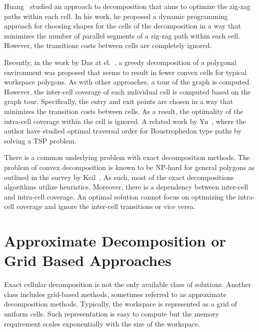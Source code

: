 \documentclass[../main.tex]{subfiles}
\begin{document}
Huang~\cite{Huang2001optimal} studied an approach to decomposition that aims to optimize the zig-zag paths within each cell. In his work, he proposed a dynamic programming approach for choosing shapes for the cells of the decomposition in a way that minimizes the number of parallel segments of a zig-zag path within each cell. However, the transitions costs between cells are completely ignored.

Recently, in the work by Das at el.~\cite{das2014mapping}, a greedy decomposition of a polygonal environment was proposed that seems to result in fewer convex cells for typical workspace polygons. As with other approaches, a tour of the graph is computed. However, the inter-cell coverage of each individual cell is computed based on the graph tour. Specifically, the entry and exit points are chosen in a way that minimizes the transition costs between cells. As a result, the optimality of the intra-cell coverage within the cell is ignored. A related work by Yu~\cite{yu2015optimization}, where the author have studied optimal traversal order for Boustrophedon type paths by solving a TSP problem.

There is a common underlying problem with exact decomposition methods. The problem of convex decomposition is known to be NP-hard for general polygons as outlined in the survey by Keil~\cite{keil2000polygon}. As such, most of the exact decompositions algorithms utilize heuristics. Moreover, there is a dependency between inter-cell and intra-cell coverage. An optimal solution cannot focus on optimizing the intra-cell coverage and ignore the inter-cell transitions or vice versa.


\section{Approximate Decomposition or Grid Based Approaches}
\label{section:grid_based_approaches}

Exact cellular decomposition is not the only available class of solutions. Another class includes grid-based methods, sometimes referred to as approximate decomposition methods. Typically, the workspace is represented as a grid of uniform cells. Such representation is easy to compute but the memory requirement scales exponentially with the size of the workspace.
\end{document}

